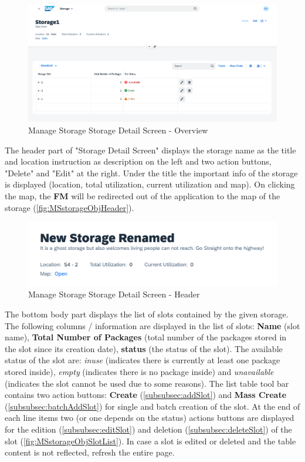 \begin{figure}[H]
	\centering
	\includegraphics[width=1\linewidth]{images/user_doc/storage/updatedSlotEditDelete/StorageObjectOverview.png}
	\caption{Manage Storage Storage Detail Screen - Overview}
	\label{fig:MSdetailOVerview}
\end{figure}

The header part of "Storage Detail Screen" displays the storage name as the title and location instruction as description on the left and two action buttons, "Delete" and "Edit" at the right.
Under the title the important info of the storage is displayed (location, total utilization, current utilization and map). On clicking the map, the \textbf{FM} will be redirected out of the application to the map of the storage (\autoref{fig:MSstorageObjHeader}).

\begin{figure}[H] %
	\centering
	\includegraphics[width=1\linewidth]{images/user_doc/storage/StorageObjectPage/StorageObjHeader.png}
	\caption{Manage Storage Storage Detail Screen - Header}
	\label{fig:MSstorageObjHeader}
\end{figure}

The bottom body part displays the list of slots contained by the given storage. 
The following columns / information are displayed in the list of slots: \textbf{Name} (slot name), \textbf{Total Number of Packages} (total number of the packages stored in the slot since its creation date), \textbf{status} (the status of the slot). The available status of the slot are: \textit{inuse} (indicates there is currently at least one package stored inside), \textit{empty} (indicates there is no package inside) and \textit{unavailable} (indicates the slot cannot be used due to some reasons).
The list table tool bar contains two action buttons: \textbf{Create} (\autoref{subsubsec:addSlot}) and \textbf{Mass Create} (\autoref{subsubsec:batchAddSlot}) for single and batch creation of the slot. 
At the end of each line items two (or one depends on the status) actions buttons are displayed for the edition (\autoref{subsubsec:editSlot}) and deletion (\autoref{subsubsec:deleteSlot}) of the slot (\autoref{fig:MSstorageObjSlotList}).
In case a slot is edited or deleted and the table content is not reflected, refresh the entire page.

